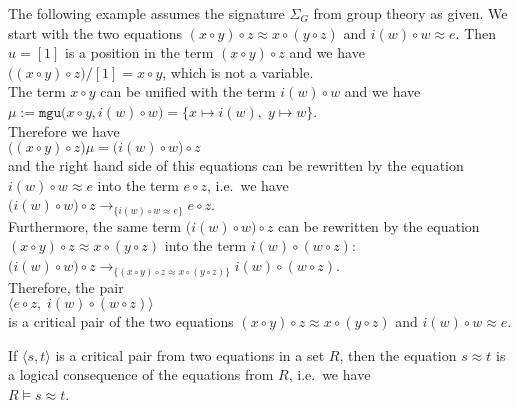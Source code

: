 \example
The following example assumes the signature $\Sigma_G$ from group theory as given.
We start with the two equations $(x \circ y) \circ z \approx x \circ (y \circ z)$ and $i(w) \circ w \approx e$.
Then $u = [1]$ is a position in the term $(x \circ y) \circ z$ and we have
\\[0.2cm]
\hspace*{1.3cm}
$\bigl((x \circ y) \circ z\bigr)/[1] = x \circ y$, which is not a variable.
\\[0.2cm]
The term $x \circ y$ can be unified with the term $i(w) \circ w$ and we have
\\[0.2cm]
\hspace*{1.3cm}
$\mu := \texttt{mgu}\bigl(x \circ y, i(w) \circ w\bigr) = \{ x \mapsto i(w),\; y \mapsto w \}$.
\\[0.2cm]
Therefore we have
\\[0.2cm]
\hspace*{1.3cm}
$\bigl((x \circ y) \circ z\bigr)\mu = \bigl(i(w) \circ w\bigr) \circ z$
\\[0.2cm]
and the right hand side of this equations can be rewritten by the equation $i(w) \circ w \approx e$ into the term $e \circ z$,
i.e.~we have
\\[0.2cm]
\hspace*{1.3cm}
$\bigl(i(w) \circ w\bigr) \circ z \rightarrow_{\{ i(w) \circ w \approx e\}} e \circ z$.
\\[0.2cm]
Furthermore, the same term $\bigl(i(w) \circ w\bigr) \circ z$ can be rewritten by the equation
$(x \circ y) \circ z \approx x \circ (y \circ z)$ into the term $i(w) \circ (w \circ z)$:  
\\[0.2cm]
\hspace*{1.3cm}
$\bigl(i(w) \circ w\bigr) \circ z \rightarrow_{\{ (x \circ y) \circ z \approx x \circ (y \circ z)\}} i(w) \circ (w \circ z)$.
\\[0.2cm]
Therefore, the pair
\\[0.2cm]
\hspace*{1.3cm}
$\bigl\langle e \circ z,\; i(w) \circ (w \circ z) \bigr\rangle$
\\[0.2cm]
is a critical pair of the two equations  $(x \circ y) \circ z \approx x \circ (y \circ z)$ and $i(w) \circ w \approx e$.
\eox

\remark
If $\langle s, t\rangle$ is a critical pair from two equations in a set $R$, then the equation $s \approx t$
is a logical consequence of the equations from $R$, i.e.~we have
\\[0.2cm]
\hspace*{1.3cm}
$R \models s \approx t$. \eox


